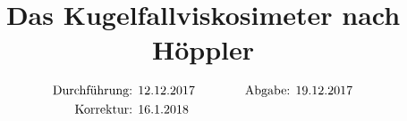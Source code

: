 

\subject{v107}
\title{Das Kugelfallviskosimeter nach Höppler}

\date{
  \begin{align}
    \text{Durchführung: } & \text{12.12.2017} & \hspace{3em} & \text{Abgabe: 19.12.2017} \notag
\\  \text{Korrektur: } & \text{16.1.2018} & \hspace {3em} & \notag
  \end{align}
}




\maketitle
\thispagestyle{empty}
\tableofcontents
\newpage






\nocite{*}
\printbibliography{}


